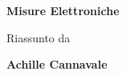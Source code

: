 \documentclass[titlepage, oneside]{book}
\begin{document}
\begin{titlepage}
\centering

 \vspace*{\fill}
    {\Huge\bfseries
Misure Elettroniche\par
}
\vspace{6ex}
{\Large
Riassunto da
\par}

        \vspace{1.5cm}
            
        \textbf{\large Achille Cannavale}
            
        \vfill

        \vspace{0.8cm}

   
\end{titlepage}

\large
\tableofcontents
\Large













\end{document}

